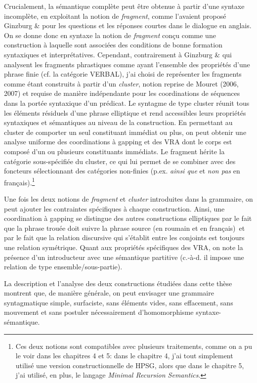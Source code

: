 Crucialement, la sémantique complète peut être obtenue à partir d'une syntaxe incomplète, en exploitant la notion de \textit{fragment}, comme l'avaient proposé Ginzburg \& \citet{Sag2000} pour les questions et les réponses courtes dans le dialogue en anglais. On se donne donc en syntaxe la notion de \textit{fragment} conçu comme une construction à laquelle sont associées des conditions de bonne formation syntaxiques et interprétatives. Cependant, contrairement à Ginzburg \& \citet{Sag2000} qui analysent les fragments phrastiques comme ayant l'ensemble des propriétés d'une phrase finie (cf. la catégorie VERBAL), j'ai choisi de représenter les fragments comme étant construits à partir d'un \textit{cluster}, notion reprise de Mouret (2006, 2007) et requise de manière indépendante pour les coordinations de séquences dans la portée syntaxique d'un prédicat. Le syntagme de type cluster réunit tous les éléments résiduels d'une phrase elliptique et rend accessibles leurs propriétés syntaxiques et sémantiques au niveau de la construction. En permettant au cluster de comporter un seul constituant immédiat ou plus, on peut obtenir une analyse uniforme des coordinations à gapping et des VRA dont le corps est composé d'un ou plusieurs constituants immédiats. Le fragment hérite la catégorie sous-spécifiée du cluster, ce qui lui permet de se combiner avec des foncteurs sélectionnant des catégories non-finies (p.ex. \textit{ainsi que} et \textit{non pas} en français).\footnote{Ces deux notions sont compatibles avec plusieurs traitements, comme on a pu le voir dans les chapitres 4 et 5: dans le chapitre 4, j'ai tout simplement utilisé une version constructionnelle de HPSG, alors que dans le chapitre 5, j'ai utilisé, en plus, le langage \textit{Minimal Recursion Semantics}.}  

Une fois les deux notions de \textit{fragment} et \textit{cluster} introduites dans la grammaire, on peut ajouter les contraintes spécifiques à chaque construction. Ainsi, une coordination à gapping se distingue des autres constructions elliptiques par le fait que la phrase trouée doit suivre la phrase source (en roumain et en français)~et par le fait que la relation discursive qui s'établit entre les conjoints est toujours une relation symétrique. Quant aux propriétés spécifiques des VRA, on note la présence d'un introducteur avec une sémantique partitive (c.-à-d. il impose une relation de type ensemble/sous-partie).

La description et l'analyse des deux constructions étudiées dans cette thèse montrent que, de manière générale, on peut envisager une grammaire syntagmatique simple, surfaciste, sans éléments vides, sans effacement, sans mouvement et sans postuler nécessairement d'homomorphisme syntaxe-sémantique.

